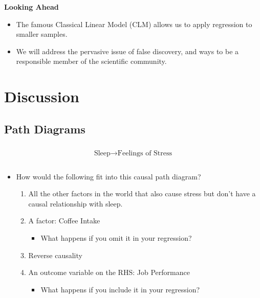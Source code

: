 \documentclass[
]{book}
\providecommand{\tightlist}{%
  \setlength{\itemsep}{0pt}\setlength{\parskip}{0pt}}
\theoremstyle{definition}
\theoremstyle{definition}
\theoremstyle{definition}
\theoremstyle{definition}
\theoremstyle{remark}
\begin{document}
\textbf{Looking Ahead}

\begin{itemize}
\tightlist
\item
  The famous Classical Linear Model (CLM) allows us to apply regression to smaller samples.
\item
  We will address the pervasive issue of false discovery, and ways to be a responsible member of the scientific community.
\end{itemize}

\hypertarget{discussion-1}{%
\section{Discussion}\label{discussion-1}}

\hypertarget{path-diagrams}{%
\subsection{Path Diagrams}\label{path-diagrams}}

\[
\begin{matrix}
\\
\text{Sleep} \rightarrow \text{Feelings of Stress} \\
\\
\end{matrix}
\]

\begin{itemize}
\tightlist
\item
  How would the following fit into this causal path diagram?

  \begin{enumerate}
  \def\labelenumi{\arabic{enumi}.}
  \tightlist
  \item
    All the other factors in the world that also cause stress but don't have a causal relationship with sleep.
  \item
    A factor: Coffee Intake

    \begin{itemize}
    \tightlist
    \item
      What happens if you omit it in your regression?
    \end{itemize}
  \item
    Reverse causality
  \item
    An outcome variable on the RHS: Job Performance

    \begin{itemize}
    \tightlist
    \item
      What happens if you include it in your regression?
    \end{itemize}
  \end{enumerate}
\end{itemize}
\end{document}
